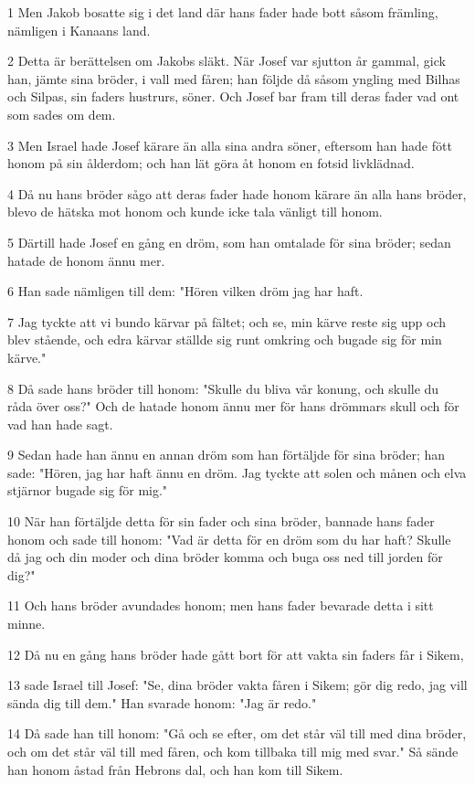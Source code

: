 \par 1 Men Jakob bosatte sig i det land där hans fader hade bott såsom främling, nämligen i Kanaans land.
\par 2 Detta är berättelsen om Jakobs släkt. När Josef var sjutton år gammal, gick han, jämte sina bröder, i vall med fåren; han följde då såsom yngling med Bilhas och Silpas, sin faders hustrurs, söner. Och Josef bar fram till deras fader vad ont som sades om dem.
\par 3 Men Israel hade Josef kärare än alla sina andra söner, eftersom han hade fött honom på sin ålderdom; och han lät göra åt honom en fotsid livklädnad.
\par 4 Då nu hans bröder sågo att deras fader hade honom kärare än alla hans bröder, blevo de hätska mot honom och kunde icke tala vänligt till honom.
\par 5 Därtill hade Josef en gång en dröm, som han omtalade för sina bröder; sedan hatade de honom ännu mer.
\par 6 Han sade nämligen till dem: "Hören vilken dröm jag har haft.
\par 7 Jag tyckte att vi bundo kärvar på fältet; och se, min kärve reste sig upp och blev stående, och edra kärvar ställde sig runt omkring och bugade sig för min kärve."
\par 8 Då sade hans bröder till honom: "Skulle du bliva vår konung, och skulle du råda över oss?" Och de hatade honom ännu mer för hans drömmars skull och för vad han hade sagt.
\par 9 Sedan hade han ännu en annan dröm som han förtäljde för sina bröder; han sade: "Hören, jag har haft ännu en dröm. Jag tyckte att solen och månen och elva stjärnor bugade sig för mig."
\par 10 När han förtäljde detta för sin fader och sina bröder, bannade hans fader honom och sade till honom: "Vad är detta för en dröm som du har haft? Skulle då jag och din moder och dina bröder komma och buga oss ned till jorden för dig?"
\par 11 Och hans bröder avundades honom; men hans fader bevarade detta i sitt minne.
\par 12 Då nu en gång hans bröder hade gått bort för att vakta sin faders får i Sikem,
\par 13 sade Israel till Josef: "Se, dina bröder vakta fåren i Sikem; gör dig redo, jag vill sända dig till dem." Han svarade honom: "Jag är redo."
\par 14 Då sade han till honom: "Gå och se efter, om det står väl till med dina bröder, och om det står väl till med fåren, och kom tillbaka till mig med svar." Så sände han honom åstad från Hebrons dal, och han kom till Sikem.
